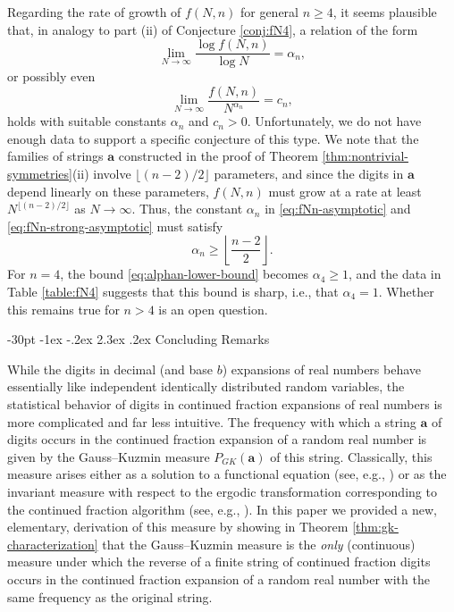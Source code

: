\documentclass[10pt]{article}
\makeatletter
\renewcommand\section{\@startsection {section}{1}{\z@}
{-30pt \@plus -1ex \@minus -.2ex}
{2.3ex \@plus.2ex}
{\normalfont\normalsize\bfseries\boldmath}}
\theoremstyle{definition}
\numberwithin{equation}{section}
\numberwithin{lemma}{section}
\newcommand{\bfa}{\mathbf{a}}
\makeatother
\begin{document}
Regarding the rate of growth of $f(N,n)$ for general $n\ge4$, it seems
plausible that, in analogy to part (ii) of  
Conjecture \ref{conj:fN4}, a relation of the form 
\begin{equation}
\label{eq:fNn-asymptotic}
\lim_{N\to\infty}\frac{\log f(N,n)}{\log N}=\alpha_n,
\end{equation}
or possibly even 
\begin{equation}
\label{eq:fNn-strong-asymptotic}
\lim_{N\to\infty}\frac{f(N,n)}{N^{\alpha_n}}=c_n,
\end{equation}
holds with suitable constants  $\alpha_n$ and $c_n>0$. Unfortunately, we
do not have enough data to support a specific conjecture of this type.
We note that the families of strings $\bfa$
constructed in the proof of Theorem 
\ref{thm:nontrivial-symmetries}(ii) involve 
$\lfloor(n-2)/2\rfloor$ parameters, and since the digits in $\bfa$ depend
linearly on these parameters, $f(N,n)$ must grow at a rate at least 
$N^{\lfloor(n-2)/2\rfloor}$ as $N\to \infty$. Thus, the constant
$\alpha_n$ in \eqref{eq:fNn-asymptotic}
and \eqref{eq:fNn-strong-asymptotic}
must satisfy
\begin{equation}
\label{eq:alphan-lower-bound}
\alpha_n\ge \left\lfloor\frac{n-2}{2}\right\rfloor.
\end{equation}
For $n=4$, the bound \eqref{eq:alphan-lower-bound} becomes $\alpha_4\ge
1$, and the data in Table \ref{table:fN4} suggests that this bound is
sharp, i.e., that $\alpha_4=1$.  Whether this remains true for $n>4$ is
an open question.

\section{Concluding Remarks}
\label{sec:concluding-remarks}

While the digits in decimal (and base $b$) expansions of real numbers
behave essentially like independent identically distributed random
variables, the statistical behavior of digits in continued fraction
expansions of real numbers is more complicated and far less intuitive.
The frequency with which a string $\bfa$ of digits occurs in the
continued fraction expansion of a random real number is given by
the Gauss--Kuzmin measure $P_{GK}(\bfa)$ of this string.  Classically,
this measure arises either as a solution to a functional equation (see,
e.g., \cite{khinchin-book}) or as the invariant measure with
respect to the ergodic transformation corresponding to the continued
fraction algorithm (see, e.g., \cite{dajani-kraaikamp-book}). 
In this paper we provided a new, elementary,
derivation of this measure by showing in Theorem
\ref{thm:gk-characterization} that the Gauss--Kuzmin measure is the
\emph{only}
(continuous) measure under which the reverse of a finite string of
continued fraction digits occurs in the continued fraction expansion of
a random real number with the same frequency as the original string.
\end{document}
